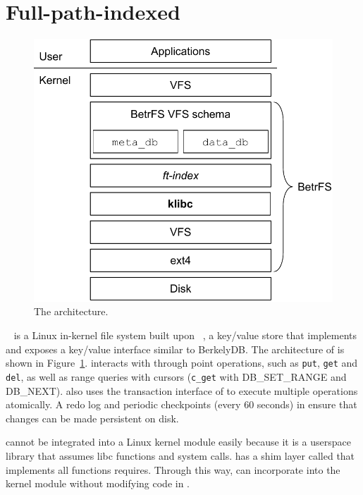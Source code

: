 \section{Full-path-indexed \betrfs}
\label{sec:fpi}

\begin{figure}
    \centering
    \includegraphics{fig/betrfs}
    \caption[The \betrfs architecture]{\label{fig:betrfs}
        The \betrfs architecture.}
\end{figure}

\betrfs~\citep{betrfs1,betrfs1tos} is a Linux in-kernel file
system built upon \fti~\citep{fti}, a key/value store that implements \bets and
exposes a key/value interface similar to BerkelyDB.
The architecture of \betrfs is shown in Figure~\ref{fig:betrfs}.
\betrfs interacts with \fti through point operations, such as \texttt{put},
\texttt{get} and \texttt{del}, as well as range queries with cursors
(\texttt{c\_get} with DB\_SET\_RANGE and DB\_NEXT).
\betrfs also uses the transaction interface of \fti to execute multiple
operations atomically.
A redo log and periodic checkpoints (every 60 seconds) in \fti ensure that
changes can be made persistent on disk.

\Fti cannot be integrated into a Linux kernel module easily because
it is a userspace library that assumes libc functions and system calls.
\betrfs has a shim layer called \klibc that implements all functions \fti
requires.
Through this way, \betrfs can incorporate \fti into the kernel module without
modifying code in \fti.


